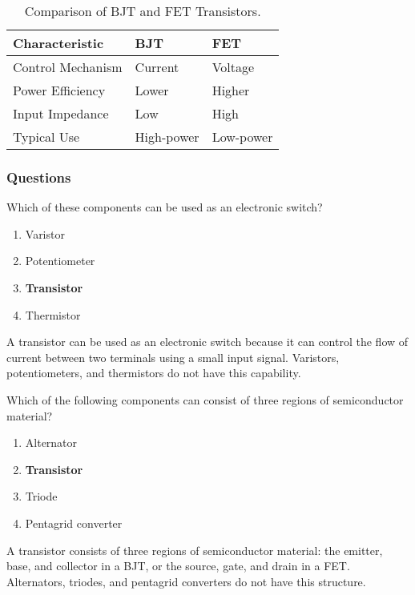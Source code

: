 \begin{table}[h!]
    \centering
    \begin{tabular}{|l|l|l|}
        \hline
        \textbf{Characteristic} & \textbf{BJT} & \textbf{FET} \\
        \hline
        Control Mechanism & Current & Voltage \\
        Power Efficiency & Lower & Higher \\
        Input Impedance & Low & High \\
        Typical Use & High-power & Low-power \\
        \hline
    \end{tabular}
    \caption{Comparison of BJT and FET Transistors.}
    \label{tab:bjt_fet_comparison}
\end{table}

\subsubsection*{Questions}
\begin{tcolorbox}[colback=gray!10!white,colframe=black!75!black,title={T6B03}]
    Which of these components can be used as an electronic switch?
    \begin{enumerate}[label=\Alph*),noitemsep]
        \item Varistor
        \item Potentiometer
        \item \textbf{Transistor}
        \item Thermistor
    \end{enumerate}
\end{tcolorbox}
A transistor can be used as an electronic switch because it can control the flow of current between two terminals using a small input signal. Varistors, potentiometers, and thermistors do not have this capability.

\begin{tcolorbox}[colback=gray!10!white,colframe=black!75!black,title={T6B04}]
    Which of the following components can consist of three regions of semiconductor material?
    \begin{enumerate}[label=\Alph*),noitemsep]
        \item Alternator
        \item \textbf{Transistor}
        \item Triode
        \item Pentagrid converter
    \end{enumerate}
\end{tcolorbox}
A transistor consists of three regions of semiconductor material: the emitter, base, and collector in a BJT, or the source, gate, and drain in a FET. Alternators, triodes, and pentagrid converters do not have this structure.

